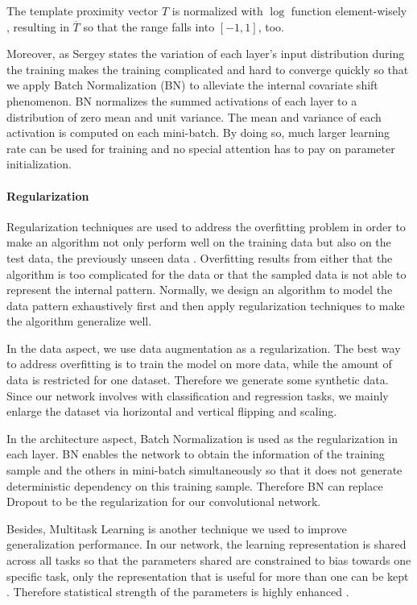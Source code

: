 The template proximity vector $T$  is normalized with $\log$ function element-wisely \cite{DBLP:journals/corr/ChabotCRTC17}, resulting in $\overline T$ so that the range falls into $[-1, 1]$, too.

Moreover, as Sergey \etal \cite{DBLP:journals/corr/IoffeS15}states the variation of each layer's input distribution during the training makes the training complicated and hard to converge quickly so that we apply Batch Normalization (BN) to alleviate the internal covariate shift phenomenon.  BN normalizes the summed activations of each layer to a distribution of zero mean and unit variance. The mean and variance of each activation is computed on each mini-batch. By doing so, much larger learning rate can be used for training and no special attention has to pay on parameter initialization. 
 
\paragraph{Regularization}
Regularization techniques are used to address the overfitting problem in order to make an algorithm not only perform well on the training data but also on the test data, the previously unseen data \cite{Goodfellow-et-al-2016}. Overfitting results from either that the algorithm is too complicated for the data or that the sampled data is not able to represent the internal pattern. Normally, we design an algorithm to model  the data pattern exhaustively first and then apply regularization techniques to make the algorithm generalize well.  

In the data aspect, we use data augmentation as a regularization. The best way to address overfitting is to train the model on more data, while the amount of data is restricted for one dataset. Therefore we generate some synthetic data. Since our network involves with classification and regression tasks, we mainly enlarge the dataset via horizontal and vertical flipping and scaling. 

In the architecture aspect, Batch Normalization \cite{DBLP:journals/corr/IoffeS15} is used as the regularization in each layer. BN enables the network to obtain the information of the training sample and the others in mini-batch simultaneously so that it does not generate deterministic dependency on this training sample. Therefore BN can replace Dropout \cite{JMLR:v15:srivastava14a} to be the regularization for our convolutional network. 

Besides, Multitask Learning is another technique we used to improve generalization performance. 
In our network, the learning representation is shared across all tasks so that the parameters shared are constrained to bias towards one specific task, \ie only the representation that is useful for more than one can be kept \cite{Goodfellow-et-al-2016}.  Therefore statistical strength of the parameters is highly enhanced \cite{Baxter:1995:LIR:225298.225336}.

